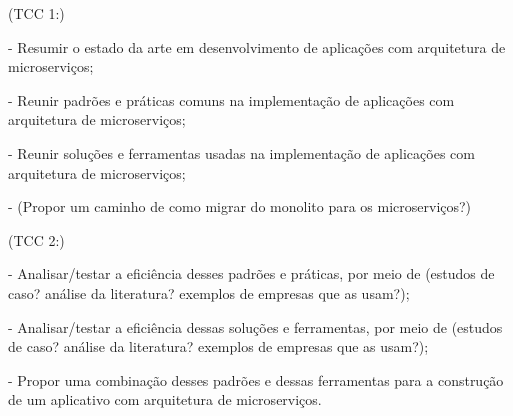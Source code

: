 (TCC 1:)

- Resumir o estado da arte em desenvolvimento de aplicações com arquitetura de microserviços;

- Reunir padrões e práticas comuns na implementação de aplicações com arquitetura de microserviços;

- Reunir soluções e ferramentas usadas na implementação de aplicações com arquitetura de microserviços;

- (Propor um caminho de como migrar do monolito para os microserviços?)

(TCC 2:)

- Analisar/testar a eficiência desses padrões e práticas, por meio de (estudos de caso? análise da literatura? exemplos de empresas que as usam?);

- Analisar/testar a eficiência dessas soluções e ferramentas, por meio de (estudos de caso? análise da literatura? exemplos de empresas que as usam?);

- Propor uma combinação desses padrões e dessas ferramentas para a construção de um aplicativo com arquitetura de microserviços.